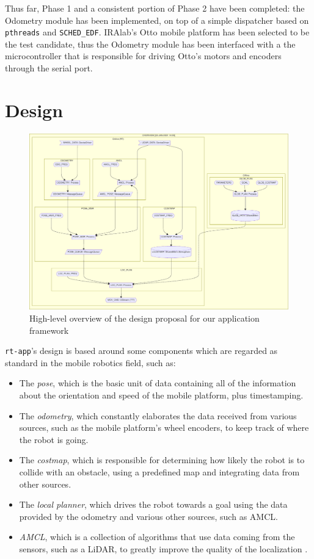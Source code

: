 \documentclass[a4paper,12pt]{report}
\begin{document}
Thus far, Phase 1 and a consistent portion of Phase 2 have been completed: the Odometry module has been implemented, on top of a simple dispatcher based on \texttt{pthreads} and \texttt{SCHED\_EDF}. IRAlab's Otto \cite{fdila-bs-otto} mobile platform has been selected to be the test candidate, thus the Odometry module has been interfaced with a the microcontroller that is responsible for driving Otto's motors and encoders through the serial port.

\section{Design}

\begin{figure}[H]
    \centering
    \includegraphics[width=\textwidth]{img/overview.pdf}
    \caption{High-level overview of the design proposal for our application framework}
\end{figure}

\texttt{rt-app}'s design is based around some components which are regarded as standard in the mobile robotics field, such as:
\begin{itemize}
    \item The \textit{pose}, which is the basic unit of data containing all of the information about the orientation and speed of the mobile platform, plus timestamping.
    \item The \textit{odometry}, which constantly elaborates the data received from various sources, such as the mobile platform's wheel encoders, to keep track of where the robot is going.
    \item The \textit{costmap}, which is responsible for determining how likely the robot is to collide with an obstacle, using a predefined map and integrating data from other sources.
    \item The \textit{local planner}, which drives the robot towards a goal using the data provided by the odometry and various other sources, such as AMCL.
    \item \textit{AMCL}, which is a collection of algorithms that use data coming from the sensors, such as a LiDAR, to greatly improve the quality of the localization \cite{roswiki-amcl}.
\end{itemize}
\end{document}
